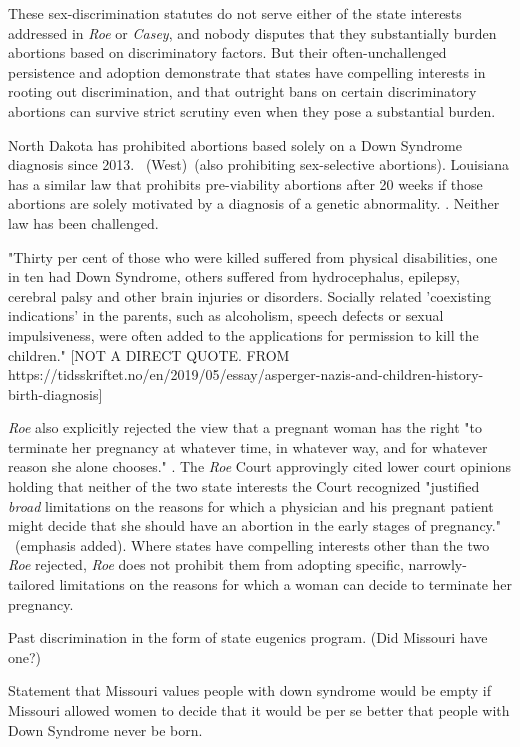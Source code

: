 \documentclass[12pt,\documentclassflag]{SCOTUS_Brief}
\begin{document}
These sex-discrimination statutes do not serve either of the state interests addressed in \textit{Roe} or \textit{Casey}, and nobody disputes that they substantially burden abortions based on discriminatory factors. But their often-unchallenged persistence and adoption demonstrate that states have compelling interests in rooting out discrimination, and that outright bans on certain discriminatory abortions can survive strict scrutiny even when they pose a substantial burden.

North Dakota has prohibited abortions based solely on a Down Syndrome diagnosis since 2013.  ~(West)~(also prohibiting sex-selective abortions). Louisiana has a similar law that prohibits pre-viability abortions after 20 weeks if those abortions are solely motivated by a diagnosis of a genetic abnormality. . Neither law has been challenged.

"Thirty per cent of those who were killed suffered from physical  disabilities, one in ten had Down Syndrome, others suffered from  hydrocephalus, epilepsy, cerebral palsy and other brain injuries or  disorders. Socially related 'coexisting indications' in the parents,  such as alcoholism, speech defects or sexual impulsiveness, were often  added to the applications for permission to kill the children."  [NOT A DIRECT QUOTE. FROM https://tidsskriftet.no/en/2019/05/essay/asperger-nazis-and-children-history-birth-diagnosis]

\textit{Roe} also explicitly rejected the view that a pregnant woman has the right "to terminate her pregnancy at whatever time, in whatever way, and for whatever reason she alone chooses." . The \textit{Roe} Court approvingly cited lower court opinions holding that neither of the two state interests the Court recognized "justified \textit{broad} limitations on the reasons for which a physician and his pregnant patient might decide that she should have an abortion in the early stages of pregnancy." ~(emphasis added). Where states have compelling interests other than the two \textit{Roe} rejected, \textit{Roe} does not prohibit them from adopting specific, narrowly-tailored limitations on the reasons for which a woman can decide to terminate her pregnancy.

Past discrimination in the form of state eugenics program. (Did Missouri have one?)

Statement that Missouri values people with down syndrome would be empty if Missouri allowed women to decide that it would be per se better that people with Down Syndrome never be born.
\end{document}
